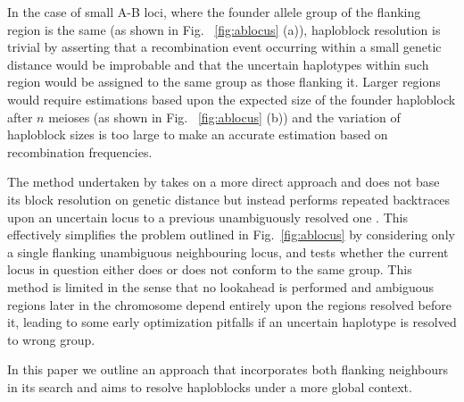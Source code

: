 In the case of small A-B loci, where the founder allele group of the flanking region is the same (as shown in Fig. ~\ref{fig:ablocus} (a)), haploblock resolution is trivial by asserting that a recombination event occurring within a small genetic distance would be improbable and that the uncertain haplotypes within such region would be assigned to the same group as those flanking it. Larger regions would require estimations based upon the expected size of the founder haploblock after $n$ meioses (as shown in Fig. ~\ref{fig:ablocus} (b)) and the variation of haploblock sizes is too large to make an accurate estimation based on recombination frequencies.

The method undertaken by \app takes on a more direct approach and does not base its block resolution on genetic distance but instead performs repeated backtraces upon an uncertain locus to a previous unambiguously resolved one \citep{hpaint,hpaintmanual}. This effectively simplifies the problem outlined in Fig.~\ref{fig:ablocus} by considering only a single flanking unambiguous neighbouring locus, and tests whether the current locus in question either does or does not conform to the same group. This method is limited in the sense that no lookahead is performed and ambiguous regions later in the chromosome depend entirely upon the regions resolved before it, leading to some early optimization pitfalls if an uncertain haplotype is resolved to wrong group.


In this paper we outline an approach that incorporates both flanking neighbours in its search and aims to resolve haploblocks under a more global context.